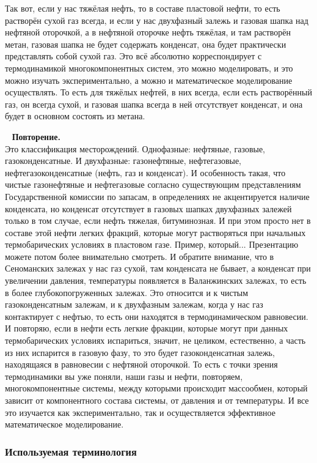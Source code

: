 \documentclass[main.tex]{subfiles}
\begin{document}
Так вот, если у нас тяжёлая нефть, то в составе пластовой нефти, то есть растворён сухой газ всегда, и если у нас двухфазный залежь и газовая шапка над нефтяной оторочкой, а в нефтяной оторочке нефть тяжёлая, и там растворён метан, газовая шапка не будет содержать конденсат, она будет практически представлять собой сухой газ.
Это всё абсолютно корреспондирует с термодинамикой многокомпонентных систем, это можно моделировать, и это можно изучать экспериментально, а можно и математическое моделирование осуществлять.
То есть для тяжёлых нефтей, в них всегда, если есть растворённый газ, он всегда сухой, и газовая шапка всегда в ней отсутствует конденсат, и она будет в основном состоять из метана.

\ \newline
\textbf{Повторение.}\\
Это классификация месторождений.
Однофазные: нефтяные, газовые, газоконденсатные.
И двухфазные: газонефтяные, нефтегазовые, нефтегазоконденсатные (нефть, газ и конденсат).
И особенность такая, что чистые газонефтяные и нефтегазовые согласно существующим представлениям Государственной комиссии по запасам, в определениях не акцентируется наличие конденсата, но конденсат отсутствует в газовых шапках двухфазных залежей только в том случае, если нефть тяжелая, битуминозная.
И при этом просто нет в составе этой нефти легких фракций, которые могут растворяться при начальных термобарических условиях в пластовом газе.
Пример, который... Презентацию можете потом более внимательно смотреть.
И обратите внимание, что в Сеноманских залежах у нас газ сухой, там конденсата не бывает, а конденсат при увеличении давления, температуры появляется в Валанжинских залежах, то есть в более глубокопогруженных залежах.
Это относится и к чистым газоконденсатным залежам, и к двухфазным залежам, когда у нас газ контактирует с нефтью, то есть они находятся в термодинамическом равновесии.
И повторяю, если в нефти есть легкие фракции, которые могут при данных термобарических условиях испариться, значит, не целиком, естественно, а часть из них испарится в газовую фазу, то это будет газоконденсатная залежь, находящаяся в равновесии с нефтяной оторочкой.
То есть с точки зрения термодинамики вы уже поняли, наши газы и нефти, повторяем, многокомпонентные системы, между которыми происходит массообмен, который зависит от компонентного состава системы, от давления и от температуры.
И все это изучается как экспериментально, так и осуществляется эффективное математическое моделирование.

\subsubsection{Используемая терминология}
\end{document}
